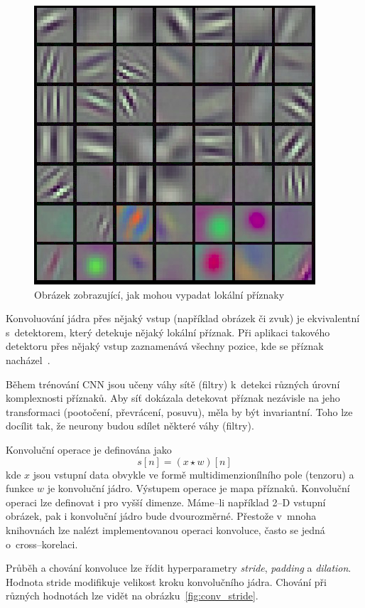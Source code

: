 \begin{figure}[H]
    \centering
    \includegraphics[scale=0.35]{obrazky-figures/features.png}
    \caption{\label{fig:features}Obrázek zobrazující, jak mohou vypadat lokální příznaky}
\end{figure}


Konvoluování jádra přes nějaký vstup (například obrázek či zvuk) je ekvivalentní s~detektorem, který detekuje nějaký lokální příznak. Při aplikaci takového detektoru přes nějaký vstup zaznamenává všechny pozice, kde se příznak nacházel~\cite{mitdeeplearning_small}.

Během trénování CNN jsou učeny váhy sítě (filtry) k~detekci různých úrovní komplexnosti příznaků. Aby síť dokázala detekovat příznak nezávisle na jeho transformaci (pootočení, převrácení, posuvu), měla by být invariantní. Toho lze docílit tak, že neurony budou sdílet některé váhy (filtry).


Konvoluční operace je definována jako
\begin{equation}
   s[n] = (x \star w)[n]
\end{equation}
kde $x$ jsou vstupní data obvykle ve formě multidimenzionílního pole (tenzoru) a funkce $w$ je konvoluční jádro. Výstupem operace je mapa příznaků. Konvoluční operaci lze definovat i pro vyšší dimenze. Máme--li například 2--D vstupní obrázek, pak i konvoluční jádro bude dvourozměrné. Přestože v~mnoha knihovnách lze nalézt implementovanou operaci konvoluce, často se jedná o~cross--korelaci.


Průběh a chování konvoluce lze řídit hyperparametry \textit{stride}, \textit{padding} a \textit{dilation}. Hodnota stride modifikuje velikost kroku konvolučního jádra. Chování při různých hodnotách lze vidět na obrázku~\ref{fig:conv_stride}. 


